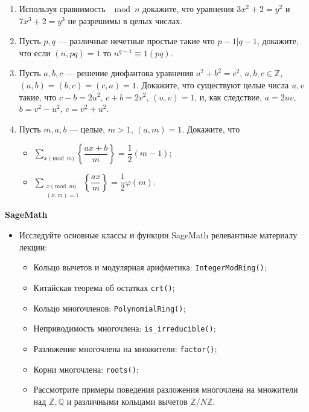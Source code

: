 \begin{enumerate}[topsep=0pt]
    \item Используя сравнимость $\mod n$  докажите, что уравнения $3x^2+2=y^2$ и $7x^3+2=y^3$ не разрешимы в целых числах.
    \item Пусть $p,q$ --- различные нечетные простые такие что $p-1|q-1$, докажите, что если $(n,pq)=1$ то $n^{q-1} \equiv 1 (pq)$.
    \item Пусть $a,b,c$ --- решение диофантова уравнения $a^2+b^2=c^2$, $a,b,c \in \mathbb{Z}$, $(a,b)=(b,c)=(c,a)=1$. Докажите, что существуют целые числа $u,v$ такие, что $c-b=2u^2$, $c+b=2v^2$, $(u,v)=1$, и, как следствие, $a=2uv$, $b=v^2-u^2$, $c=v^2+u^2$.
    \item Пусть $m,a,b$ --- целые, $m>1$, $(a,m)=1$. Докажите, что
    \begin{itemize}
        \item $\sum\limits_{x \pmod m} \left\{ \dfrac{ax+b}{m} \right\} = \dfrac{1}{2}(m-1)$;
        \item $\sum\limits_{\substack{x \pmod m\\(x,m)=1}} \left\{ \dfrac{ax}{m} \right\} = \dfrac{1}{2}\varphi(m)$.
    \end{itemize}
    
\end{enumerate}

\noindent\textbf{SageMath}
\begin{itemize}[topsep=0pt]

    \item Исследуйте основные классы и функции SageMath релевантные материалу лекции:
    \begin{itemize}[noitemsep,topsep=0pt]
        \item Кольцо вычетов и модулярная арифметика: \texttt{IntegerModRing()};
        \item Китайская теорема об остатках \texttt{crt()};
        \item Кольцо многочленов: \texttt{PolynomialRing()};
        \item Неприводимость многочлена: \texttt{is\_irreducible()};
        \item Разложение многочлена на множители: \texttt{factor()};
        \item Корни многочлена: \texttt{roots()};
        \item Рассмотрите примеры поведения разложения многочлена на множители над $\mathbb{Z}, \mathbb{Q}$ и различными кольцами вычетов $\mathbb{Z}/N\mathbb{Z}$.
    \end{itemize}
    
\end{itemize}


